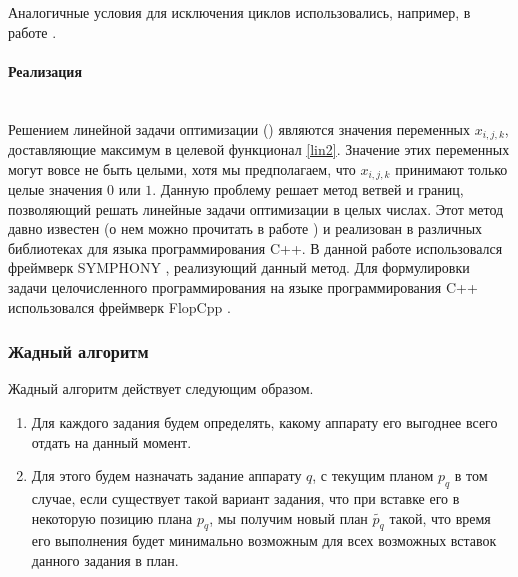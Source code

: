 \documentclass[a4paper,14pt,russian]{article}
\begin{document}
Аналогичные условия для исключения циклов использовались, например, в работе \cite{shmoys1990analyzing}.

\paragraph{Реализация} ~\\
Решением линейной задачи оптимизации () являются значения переменных  $x_{i,j,k}$, доставляющие максимум в целевой функционал \cref{lin2}.
Значение этих переменных могут вовсе не быть целыми, хотя мы предполагаем, что $x_{i,j,k}$ принимают только целые значения $0$ или $1$. Данную проблему решает метод ветвей и границ, позволяющий решать линейные задачи оптимизации в целых числах. Этот метод давно известен (о нем можно прочитать в работе \cite{lawler1966branch}) и реализован в различных библиотеках для языка программирования C++.
В данной работе использовался фреймверк SYMPHONY \cite{ralphs2005symphony}, реализующий данный метод.
Для формулировки задачи целочисленного программирования на языке программирования C++ использовался фреймверк FlopCpp \cite{hultberg2007flopc++}.




\subsubsection{Жадный алгоритм}
Жадный алгоритм действует следующим образом.



\begin{enumerate}
\item Для каждого задания будем определять, какому аппарату его выгоднее всего отдать на данный момент.
\item Для этого будем назначать задание аппарату $q$, с текущим планом $p_q$ в том случае, если существует такой вариант задания, что при вставке его в некоторую позицию плана $p_q$, мы получим новый план $\widetilde{p_q}$ такой, что время его выполнения будет минимально возможным для всех возможных вставок данного задания в план.
\end{enumerate}
\end{document}

